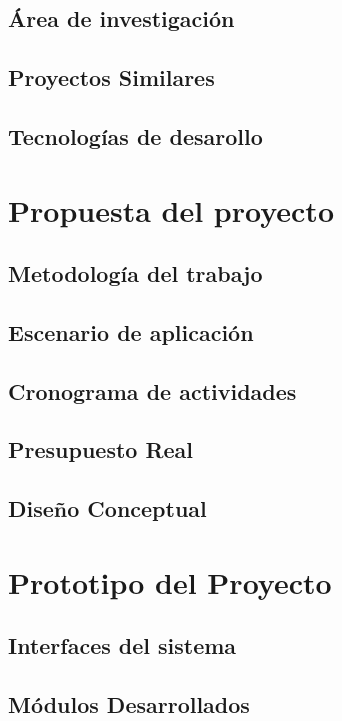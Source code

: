 \documentclass{extbook}
\begin{document}
    \section{Área de investigación}
      
      
    \section{Proyectos Similares}
      
    \section{Tecnologías de desarollo}
      

\chapter{Propuesta del proyecto}
    \section{Metodología del trabajo}
    \section{Escenario de aplicación}
    \section{Cronograma de actividades}
      

    \section{Presupuesto Real}
    \section{Diseño Conceptual}



\chapter{Prototipo del Proyecto}
    \section{Interfaces del sistema}
    \section{Módulos Desarrollados}
\end{document}
